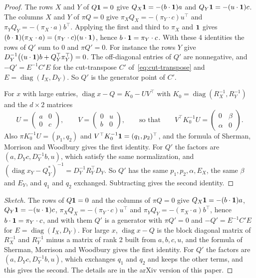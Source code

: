 \ifarxivbuild
\begin{proof}
The rows $X$ and $Y$ of $Q\mathbf{1}=0$ give $Q_X\mathbf{1}=-(b\cdot\mathbf{1})a$ and $Q_Y\mathbf{1}=-(u\cdot\mathbf{1})c$.
The columns $X$ and $Y$ of $\pi Q=0$ give $\pi_XQ_X=-(\pi_Y\cdot c)u^\top$ and
$\pi_YQ_Y=-(\pi_X\cdot a)b^\top$. Applying the first and third to $\pi_X$ and $\mathbf{1}$ gives
$(b\cdot\mathbf{1})(\pi_X\cdot a)=(\pi_Y\cdot c)(u\cdot\mathbf{1})$, hence $b\cdot\mathbf{1}=\pi_Y\cdot c$. With
these 4 identities the rows of $Q'$ sum to $0$ and $\pi Q'=0$. For instance the rows $Y$ give
$D_Y^{-1}\bigl((u\cdot\mathbf{1})b+Q_Y^\top\pi_Y^\top\bigr)=0$. The off-diagonal entries of $Q'$ are
nonnegative, and $-Q'=E^{-1}C'E$ for the cut-transpose $C'$ of~\eqref{eq:cut-transpose} and
$E=\operatorname{diag}(I_X,D_Y)$. So $Q'$ is the generator point of $C'$.

For $x$ with large entries, $\operatorname{diag}x-Q=K_0-UV^\top$ with
$K_0=\operatorname{diag}(R_X^{-1},R_Y^{-1})$ and the $d\times2$ matrices
\[
 U=\begin{pmatrix}a&0\\0&c\end{pmatrix},\qquad V=\begin{pmatrix}0&u\\b&0\end{pmatrix},\qquad
 \text{so that}\qquad V^\top K_0^{-1}U=\begin{pmatrix}0&\beta\\\alpha&0\end{pmatrix}.
\]
Also $\pi K_0^{-1}U=(p_1,q_2)$ and $V^\top K_0^{-1}\mathbf{1}=(q_1,p_2)^\top$, and the formula of Sherman,
Morrison and Woodbury gives the first identity. For $Q'$ the factors are $(a,D_Yc,D_Y^{-1}b,u)$,
which satisfy the same normalization, and $(\operatorname{diag}x_Y-Q^*_Y)^{-1}=D_Y^{-1}R_Y^\top D_Y$.
So $Q'$ has the same $p_1,p_2,\alpha,E_X$, the same $\beta$ and $E_Y$, and $q_1$ and $q_2$
exchanged. Subtracting gives the second identity.
\end{proof}
\else
\begin{proof}[Sketch]
The rows of $Q\mathbf{1}=0$ and the columns of $\pi Q=0$ give $Q_X\mathbf{1}=-(b\cdot\mathbf{1})a$,
$Q_Y\mathbf{1}=-(u\cdot\mathbf{1})c$, $\pi_XQ_X=-(\pi_Y\cdot c)u^\top$ and
$\pi_YQ_Y=-(\pi_X\cdot a)b^\top$, hence $b\cdot\mathbf{1}=\pi_Y\cdot c$, and with them $Q'$ is a
generator with $\pi Q'=0$ and $-Q'=E^{-1}C'E$ for $E=\operatorname{diag}(I_X,D_Y)$. For large $x$,
$\operatorname{diag}x-Q$ is the block diagonal matrix of $R_X^{-1}$ and $R_Y^{-1}$ minus a matrix
of rank 2 built from $a,b,c,u$, and the formula of Sherman, Morrison and Woodbury gives the first
identity. For $Q'$ the factors are $(a,D_Yc,D_Y^{-1}b,u)$, which exchanges $q_1$ and $q_2$ and
keeps the other terms, and this gives the second. The details are in the arXiv version of this
paper.
\end{proof}
\fi


